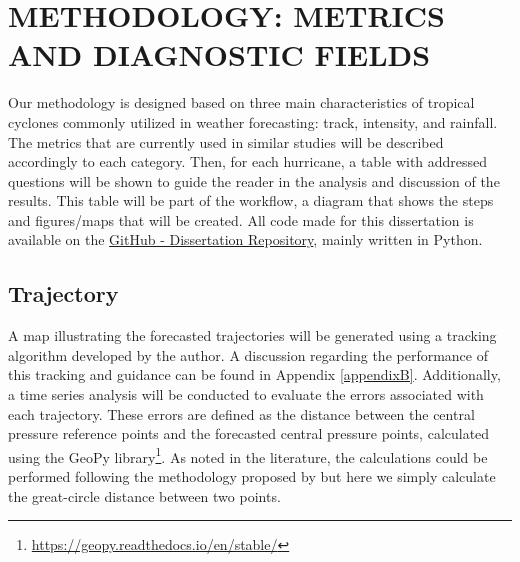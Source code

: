 \chapter{METHODOLOGY: METRICS AND DIAGNOSTIC FIELDS}
\label{ch:methods}



Our methodology is designed based on three main characteristics of tropical cyclones commonly utilized in weather forecasting: track, intensity, and rainfall. The metrics that are currently used in similar studies will be described accordingly to each category. Then, for each hurricane, a table with addressed questions will be shown to guide the reader in the analysis and discussion of the results. This table will be part of the workflow, a diagram that shows the steps and figures/maps that will be created. 
All code made for this dissertation is available on the
\href{https://github.com/biancafusi/Dissertation}{GitHub - Dissertation Repository}, mainly written in Python.


\section{Trajectory}

A map illustrating the forecasted trajectories will be generated using a tracking algorithm developed by the author. A discussion regarding the performance of this tracking and guidance can be found in Appendix \ref{appendixB}. Additionally, a time series analysis will be conducted to evaluate the errors associated with each trajectory. These errors are defined as the distance between the central pressure reference points and the forecasted central pressure points, calculated using the GeoPy library\footnote{\href{https://geopy.readthedocs.io/en/stable/}{https://geopy.readthedocs.io/en/stable/}}. As noted in the literature, the calculations could be performed following the methodology proposed by  but here we simply calculate the great-circle distance between two points. 

